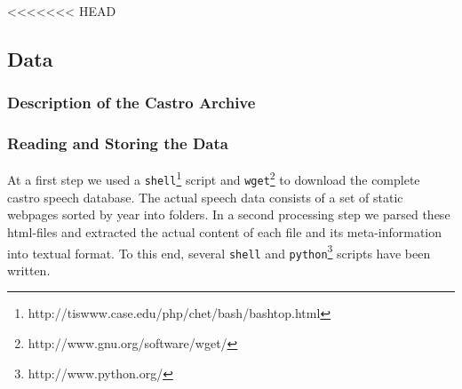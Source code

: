 
<<<<<<< HEAD
\subsection{Data}
\label{sec:data}

\subsubsection{Description of the Castro Archive}
\label{sec:description_of_the_castro_archive}

\subsubsection{Reading and Storing the Data}
\label{sec:reading_and_storing_the_data}

At a first step we used a \texttt{shell}\footnote{http://tiswww.case.edu/php/chet/bash/bashtop.html}
script and \texttt{wget}\footnote{http://www.gnu.org/software/wget/} to download the complete castro
speech database. The actual speech data consists of a set of static webpages sorted by year into
folders. In a second processing step we parsed these html-files and extracted the actual content of
each file and its meta-information into textual format. To this end, several \texttt{shell} and
\texttt{python}\footnote{http://www.python.org/} scripts have been written.

